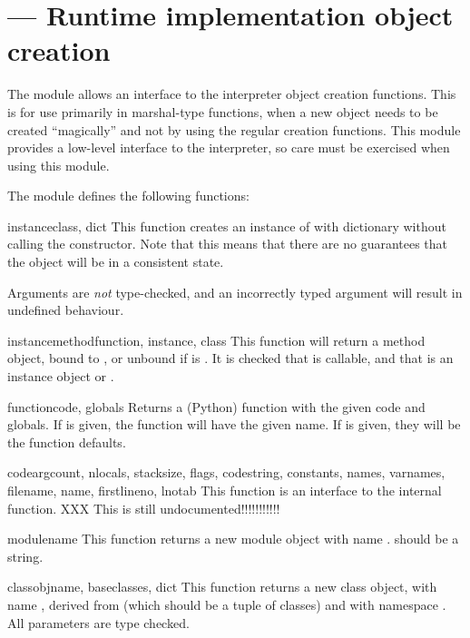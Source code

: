 \section{ ---
         Runtime implementation object creation}



The  module allows an interface to the interpreter object
creation functions. This is for use primarily in marshal-type functions,
when a new object needs to be created ``magically'' and not by using the
regular creation functions. This module provides a low-level interface
to the interpreter, so care must be exercised when using this module.

The  module defines the following functions:

\begin{funcdesc}{instance}{class, dict}
This function creates an instance of  with dictionary
 without calling the  constructor. Note that
this means that there are no guarantees that the object will be in a
consistent state.

Arguments are \emph{not} type-checked, and an incorrectly typed argument
will result in undefined behaviour.
\end{funcdesc}

\begin{funcdesc}{instancemethod}{function, instance, class}
This function will return a method object, bound to , or
unbound if  is . It is checked that
 is callable, and that  is an instance
object or .
\end{funcdesc}

\begin{funcdesc}{function}{code, globals}
Returns a (Python) function with the given code and globals. If
 is given, the function will have the given name. If
 is given, they will be the function defaults.
\end{funcdesc}

\begin{funcdesc}{code}{argcount, nlocals, stacksize, flags, codestring,
                       constants, names, varnames, filename, name, firstlineno,
                       lnotab}
This function is an interface to the  internal
function.
XXX This is still undocumented!!!!!!!!!!!
\end{funcdesc}

\begin{funcdesc}{module}{name}
This function returns a new module object with name .
 should be a string.
\end{funcdesc}

\begin{funcdesc}{classobj}{name, baseclasses, dict}
This function returns a new class object, with name , derived
from  (which should be a tuple of classes) and with
namespace . All parameters are type checked.
\end{funcdesc}

